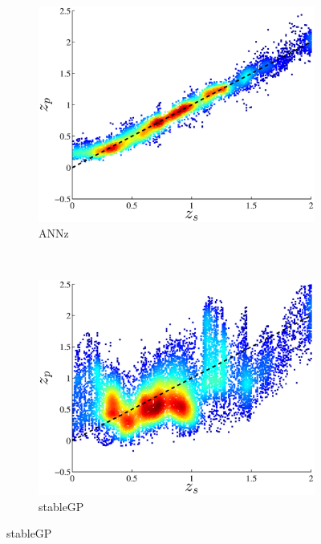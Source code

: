 \documentclass[useAMS,usenatbib,fleqn]{mn2e}
\begin{document}
\begin{figure}
        \centering
        \begin{subfigure}[b]{0.3\textwidth}
                \includegraphics[width=\textwidth]{figures/ANN.eps}
                \caption{{\sc ANNz}}
                \label{annz-plot}
        \end{subfigure}
        ~
        \begin{subfigure}[b]{0.3\textwidth}
                \includegraphics[width=\textwidth]{figures/stableGP.eps}
                \caption{{\sc stableGP}}
                \label{stableGP-plot}
        \end{subfigure}

\end{figure}
\end{document}
